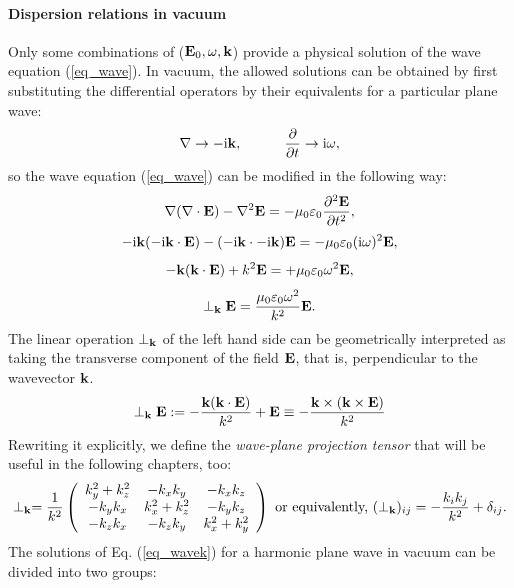 \paragraph{Dispersion relations in vacuum} %
Only some combinations of ($\mathbf{E}_0, \omega, {\mathbf{k}}$) provide a physical solution of the wave equation (\ref{eq_wave}). In vacuum, the allowed solutions can be obtained by first substituting the differential operators by their equivalents for a particular plane wave:
\begin{equation} \nabla \rightarrow -{\mathrm i}{\mathbf{k}}, \quad\quad\quad 
\frac{\partial} {\partial t} \rightarrow {\mathrm i}\omega, \label{eq_difftok}\end{equation}
so the wave equation (\ref{eq_wave}) can be modified in the following way:
$$					\nabla (\nabla \cdot \mathbf{E}) - \nabla^2 \mathbf{E}				  =	-\mu_0 \varepsilon_0 \frac{\partial^{2} \mathbf{E}}{\partial t^{2}},  $$
$$				 -{\mathrm i}{\mathbf{k}} (-{\mathrm i}{\mathbf{k}} \cdot \mathbf{E})  - (-{\mathrm i}{\mathbf{k}} \cdot -{\mathrm i}{\mathbf{k}}) \mathbf{E} = -\mu_0 \varepsilon_0 ({\mathrm i}\omega)^2 \mathbf{E}, $$
$$   - {\mathbf{k}} ({\mathbf{k}} \cdot \mathbf{E})      +          k^2 \mathbf{E}            = +\mu_0 \varepsilon_0 \omega^{2} \mathbf{E},  $$
\begin{equation}  \perp_{\mathbf{k}}\mathbf{E}            = \frac{\mu_0 \varepsilon_0 \omega^{2}}{k^2} \mathbf{E}.  \label{eq_wavek}\end{equation}
The linear operation $\perp_{\mathbf{k}}$ of the left hand side can be geometrically interpreted as taking the transverse component of the field $\mathbf{E}$, that is, perpendicular to the wavevector ${\mathbf{k}}$. 
\begin{equation} \perp_{\mathbf{k}}\mathbf{E} :=  -\frac{{\mathbf{k}} ({\mathbf{k}} \cdot \mathbf{E})}{k^2} + \mathbf{E}     \equiv     - \frac{{\mathbf{k}}\times({\mathbf{k}}\times\mathbf{E})}{k^2} \label{eq_transverse1}\end{equation}
Rewriting it explicitly, we define the \textit{wave-plane projection tensor} that will be useful in the following chapters, too:
\begin{equation} \perp_{\mathbf{k}} = \frac{1}{k^2} 
\left(\begin{array}{ccc} 
	k_y^2+k_z^2  	& -k_x k_y 		& -k_x k_z \\ 
	-k_y k_x 		& k_x^2+k_z^2	& -k_y k_z \\ 
	-k_z k_x 		& -k_z k_y		& k_x^2+k_y^2
	\end{array} \right) 
\text{ or equivalently, }
(\perp_{\mathbf{k}})_{ij} = - \frac{k_i k_j}{k^2} + \delta_{ij} .  \label{eq_transverse2}\end{equation}
The solutions of Eq. (\ref{eq_wavek}) for a harmonic plane wave in vacuum can be divided into two groups: %
